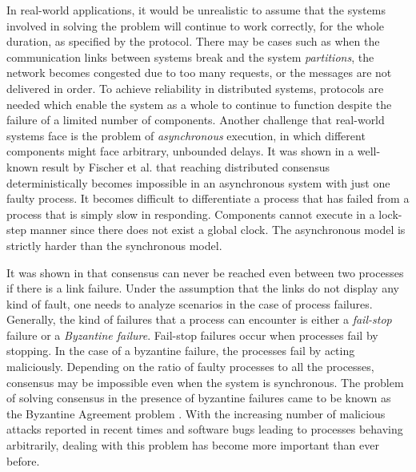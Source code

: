 In real-world applications, it would be unrealistic to assume that the systems involved in solving the problem will continue to work correctly, for the whole duration, as specified by the protocol. There may be cases such as when the communication links between systems break and the system \textit{partitions}, the network becomes congested due to too many requests, or the messages are not delivered in order. To achieve reliability in distributed systems, protocols are needed which enable the system as a whole to continue to function despite the failure of a limited number of components. Another challenge that real-world systems face is the problem of \textit{asynchronous} execution, in which different components might face arbitrary, unbounded delays. It was shown in a well-known result by Fischer et al. \cite{FischerLP83} that reaching distributed consensus deterministically becomes impossible in an asynchronous system with just one faulty process. It becomes difficult to differentiate a process that has failed from a process that is simply slow in responding. Components cannot execute in a lock-step manner since there does not exist a global clock. The asynchronous model is strictly harder than the synchronous model. 

It was shown in \cite{LamportSP82} that consensus can never be reached even between two processes if there is a link failure. Under the assumption that the links do not display any kind of fault, one needs to analyze scenarios in the case of process failures. Generally, the kind of failures that a process can encounter is either a \textit{fail-stop} failure or a \textit{Byzantine failure}. Fail-stop failures occur when processes fail by stopping. In the case of a byzantine failure, the processes fail by acting maliciously. Depending on the ratio of faulty processes to all the processes, consensus may be impossible even when the system is synchronous. The problem of solving consensus in the presence of byzantine failures came to be known as the Byzantine Agreement problem \cite{LamportSP82}. With the increasing number of malicious attacks reported in recent times and software bugs leading to processes behaving arbitrarily, dealing with this problem has become more important than ever before.

